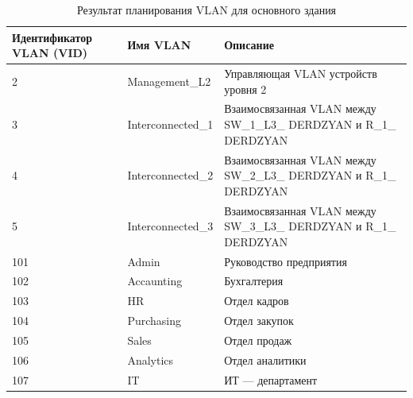 \begin{table}[H]
    \centering
	\caption{Результат планирования VLAN для основного здания\label{table:VLANS_oz}}
    \small
	\begin{tabularx}{\textwidth}{|X|X|X|}
        \hline
		Идентификатор VLAN (VID)& Имя VLAN & Описание \\ \hline
		2		&	Management\_L2	&	Управляющая VLAN устройств уровня 2 \\ \hline
		3		& Interconnected\_1	&	Взаимосвязанная VLAN между SW\_1\_L3\_ DERDZYAN и R\_1\_ DERDZYAN \\ \hline
		4		& Interconnected\_2	&	Взаимосвязанная VLAN между SW\_2\_L3\_ DERDZYAN и R\_1\_ DERDZYAN \\ \hline
		5		& Interconnected\_3	&	Взаимосвязанная VLAN между SW\_3\_L3\_ DERDZYAN и R\_1\_ DERDZYAN \\ \hline
        101     & Admin        		& Руководство предприятия       \\ \hline
        102     & Accaunting    	& Бухгалтерия                   \\ \hline
        103     & HR            	& Отдел кадров                  \\ \hline
        104     & Purchasing    	& Отдел закупок                 \\ \hline
        105     & Sales        		& Отдел продаж                  \\ \hline
        106     & Analytics     	& Отдел аналитики               \\ \hline
        107     & IT            	& ИТ --- департамент            \\ 
    \end{tabularx}
\end{table}

